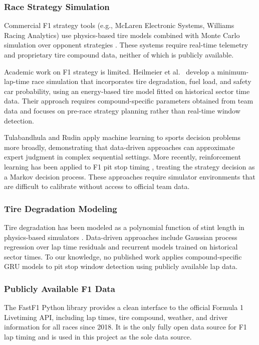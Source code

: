 \documentclass[12pt]{article}
\begin{document}
\subsubsection{Race Strategy Simulation}

Commercial F1 strategy tools (e.g., McLaren Electronic Systems, Williams Racing Analytics) use physics-based tire models combined with Monte Carlo simulation over opponent strategies \cite{mcaleer2023}. These systems require real-time telemetry and proprietary tire compound data, neither of which is publicly available.

Academic work on F1 strategy is limited. Heilmeier et al.\ \cite{heilmeier2020} develop a minimum-lap-time race simulation that incorporates tire degradation, fuel load, and safety car probability, using an energy-based tire model fitted on historical sector time data. Their approach requires compound-specific parameters obtained from team data and focuses on pre-race strategy planning rather than real-time window detection.

Tulabandhula and Rudin \cite{tulabandhula2014} apply machine learning to sports decision problems more broadly, demonstrating that data-driven approaches can approximate expert judgment in complex sequential settings. More recently, reinforcement learning has been applied to F1 pit stop timing \cite{cheng2021}, treating the strategy decision as a Markov decision process. These approaches require simulator environments that are difficult to calibrate without access to official team data.

\subsubsection{Tire Degradation Modeling}

Tire degradation has been modeled as a polynomial function of stint length in physics-based simulators \cite{heilmeier2020}. Data-driven approaches include Gaussian process regression over lap time residuals \cite{loiacono2011} and recurrent models trained on historical sector times. To our knowledge, no published work applies compound-specific GRU models to pit stop window detection using publicly available lap data.

\subsubsection{Publicly Available F1 Data}

The FastF1 Python library \cite{fastf1} provides a clean interface to the official Formula 1 Livetiming API, including lap times, tire compound, weather, and driver information for all races since 2018. It is the only fully open data source for F1 lap timing and is used in this project as the sole data source.
\end{document}
